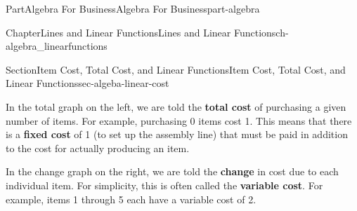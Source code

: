 \documentclass{tufte-book}
\newcommand{\terminology}[1]{\textbf{#1}}
\numberwithin{equation}{chapter}
\def \tikzhistogram (#1,#2){\draw[fill=blue,opacity=0.3] ({#1+((\xtwo-\xmin)/5)},#2) rectangle ({#1-((\xtwo-\xmin)/5)},0); \draw[draw,thick] ({#1+((\xtwo-\xmin)/5)},#2) rectangle ({#1-((\xtwo-\xmin)/5)},0); \node[draw,fill=blue, circle,inner sep=2.5pt] at (#1,#2) {};}
\begin{document}
\begin{partptx}{Part}{Algebra For Business}{}{Algebra For Business}{}{}{part-algebra}
\begin{chapterptx}{Chapter}{Lines and Linear Functions}{}{Lines and Linear Functions}{}{}{ch-algebra_linearfunctions}
\begin{sectionptx}{Section}{Item Cost, Total Cost, and Linear Functions}{}{Item Cost, Total Cost, and Linear Functions}{}{}{sec-algeba-linear-cost}
\begin{image}{0.125}{0.75}{0.125}{}
{\begin{tikzpicture}[xscale=\xscale,yscale=\yscale]


\end{tikzpicture}
\quad
{}
}%
\end{image}%
In the total graph on the left, we are told the \terminology{total cost} of purchasing a given number of items. For example, purchasing 0 items cost \textdollar{}1. This means that there is a \terminology{fixed cost} of \textdollar{}1 (to set up the assembly line) that must be paid in addition to the cost for actually producing an item.%
\par
In the change graph on the right, we are told the \terminology{change} in cost due to each individual item. For simplicity, this is often called the \terminology{variable cost}. For example, items 1 through 5 each have a variable cost of \textdollar{}2.%

\end{sectionptx}
\end{chapterptx}
\end{partptx}
\end{document}
